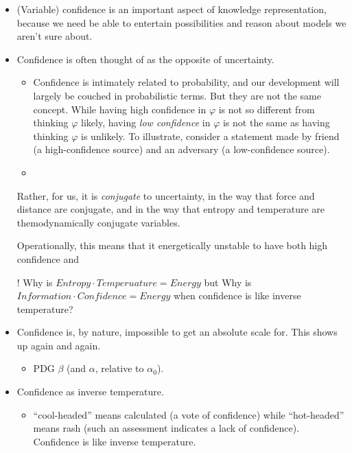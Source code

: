 \documentclass{article}
\begin{document}
\begin{itemize}
\item    
(Variable) confidence is an important aspect of knowledge representation, because we need be able to entertain possibilities and reason about models we aren't sure about.

\item
Confidence is often thought of as the opposite of uncertainty. 

\begin{itemize}
    \item
    Confidence is intimately related to probability, and our development will largely be couched in probabilistic terms. But they are not the same concept.
    While having high confidence in $\varphi$ is not so different from thinking $\varphi$ likely, having \emph{low confidence} in $\varphi$ is not the same as having thinking $\varphi$ is unlikely.
    To illustrate, consider a statement made by friend (a high-confidence source) and an adversary (a low-confidence source).
    
    \item
\end{itemize}

Rather, for us, it is \emph{conjugate} to uncertainty, in the way that force and distance are conjugate, and in the way that entropy and temperature are themodynamically conjugate variables.

Operationally, this means that it energetically unstable to have both high confidence and 

\begin{wip}
! Why is $\mathit{Entropy} \cdot \mathit{Temperuature} = \mathit{Energy}$ but 
 Why is $\mathit{Information} \cdot \mathit{Confidence} = \mathit{Energy}$ when confidence is like inverse temperature?
\end{wip}

\item 
Confidence is, by nature, impossible to get an absolute scale for. This shows up again and again. 
\begin{itemize}[nosep]
    \item PDG $\beta$ (and $\alpha$, relative to $\alpha_0$).
\end{itemize}

\item Confidence as inverse temperature.

\begin{itemize}
    \item
    ``cool-headed'' means calculated (a vote of confidence) while ``hot-headed'' means rash (such an assessment indicates a lack of confidence). Confidence is like inverse temperature.
    

\end{itemize}
\end{itemize}
\end{document}
